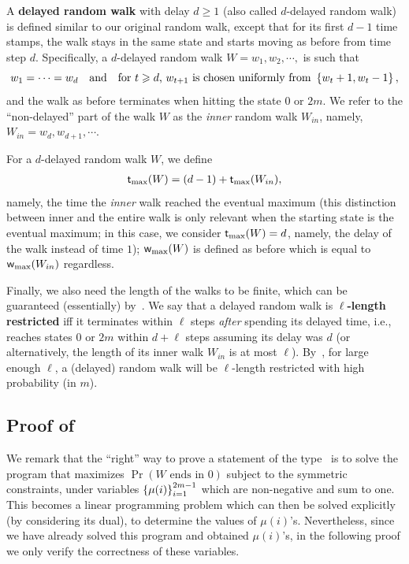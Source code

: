 A \textbf{delayed random walk} with delay $d \geq 1$ (also called $d$-delayed random walk) is defined similar to our original random walk, except that for its first $d-1$ time stamps, the walk 
stays in the same state and starts moving as before from time step $d$. Specifically, a $d$-delayed random walk $W=w_1,w_2,\cdots,$ is such that 
\[
	w_1 = \cdots = w_d \quad \text{and} \quad \text{for $t \geqslant d$,}~ w_{t+1}~\text{is chosen uniformly from}~\left\{ w_t + 1 , w_t-1 \right\}, 
\]
and the walk as before terminates when hitting the state $0$ or $2m$. We refer to the ``non-delayed'' part of the walk $W$ as the \emph{inner} random walk $W_{in}$, namely, $W_{in} = w_d, w_{d+1},\cdots$. 

For a $d$-delayed random walk $W$, we define 
\begin{align}
\textnormal{\textsf{t}}_{\textnormal{max}}(W) = (d-1)+\textnormal{\textsf{t}}_{\textnormal{max}}(W_{in}), \label{eq:timemaxW}
\end{align}
 namely, the time the \emph{inner} walk reached the eventual maximum (this distinction between inner and the entire walk is only relevant when the starting state is the eventual maximum; in this case, 
we consider $\textnormal{\textsf{t}}_{\textnormal{max}}(W)=d$, namely, the delay of the walk instead of time $1$); $\textnormal{\textsf{w}}_{\textnormal{max}}(W)$ is defined as before which is equal to $\textnormal{\textsf{w}}_{\textnormal{max}}(W_{in})$ regardless. 

Finally, we also need the length of the walks to be finite, which can be guaranteed (essentially) by~.
We say that a delayed random walk is \textbf{$\ell$-length restricted} iff 
it terminates within $\ell$ steps \emph{after} spending its delayed time, i.e., reaches states $0$ or $2m$ within $d+\ell$ steps assuming its delay was $d$ (or alternatively, the length of its inner walk $W_{in}$ is at most $\ell$). 
By~, for large enough $\ell$, a (delayed) random walk will be $\ell$-length restricted with high probability (in $m$). 





\subsection{Proof of~}
We remark that the ``right'' way to prove a statement of the type~ is to
solve the program that maximizes $\Pr(\text{$W$ ends in $0$})$ subject to the symmetric constraints, under variables $\left\{ \mu(i) \right\}_{i=1}^{2m-1}$ which are non-negative and sum to one. 
This becomes a linear programming problem which can then be solved explicitly (by considering its dual), to determine the values of $\mu(i)$'s. Nevertheless, since we have
already solved this program and obtained $\mu(i)$'s, in the following proof we only verify the correctness of these variables. 

